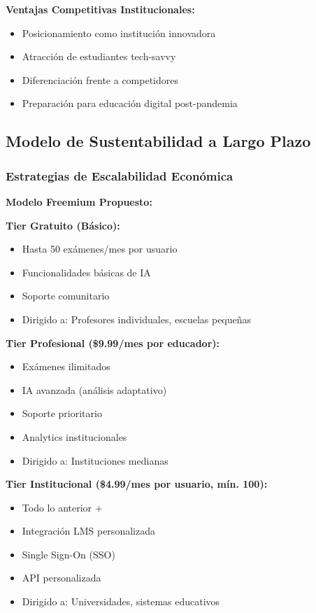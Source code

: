 \documentclass[12pt,a4paper]{report}
\begin{document}
\textbf{Ventajas Competitivas Institucionales:}
\begin{itemize}
\item Posicionamiento como institución innovadora
\item Atracción de estudiantes tech-savvy
\item Diferenciación frente a competidores
\item Preparación para educación digital post-pandemia
\end{itemize}

\subsection{Modelo de Sustentabilidad a Largo Plazo}

\subsubsection{Estrategias de Escalabilidad Económica}

\textbf{Modelo Freemium Propuesto:}

\textbf{Tier Gratuito (Básico):}
\begin{itemize}
\item Hasta 50 exámenes/mes por usuario
\item Funcionalidades básicas de IA
\item Soporte comunitario
\item Dirigido a: Profesores individuales, escuelas pequeñas
\end{itemize}

\textbf{Tier Profesional (\$9.99/mes por educador):}
\begin{itemize}
\item Exámenes ilimitados
\item IA avanzada (análisis adaptativo)
\item Soporte prioritario
\item Analytics institucionales
\item Dirigido a: Instituciones medianas
\end{itemize}

\textbf{Tier Institucional (\$4.99/mes por usuario, mín. 100):}
\begin{itemize}
\item Todo lo anterior +
\item Integración LMS personalizada
\item Single Sign-On (SSO)
\item API personalizada
\item Dirigido a: Universidades, sistemas educativos
\end{itemize}
\end{document}

